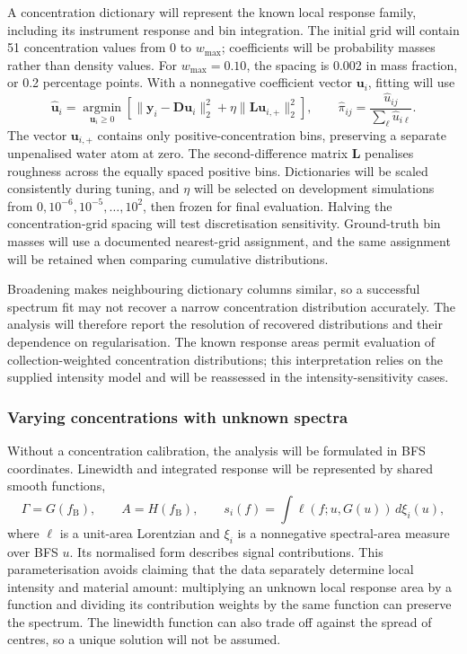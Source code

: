 \documentclass[11pt]{article}
\newcommand{\wmax}{w_{\max}}
\begin{document}
A concentration dictionary will represent the known local response family, including its instrument response and bin integration. The initial grid will contain 51 concentration values from 0 to $\wmax$; coefficients will be probability masses rather than density values. For $\wmax=0.10$, the spacing is 0.002 in mass fraction, or 0.2 percentage points. With a nonnegative coefficient vector $\mathbf u_i$, fitting will use
\begin{equation}
 \widehat{\mathbf u}_i=\underset{\mathbf u_i\geq0}{\operatorname{argmin}}
 \left[\|\mathbf y_i-\mathbf D\mathbf u_i\|_2^2+
 \eta\|\mathbf L\mathbf u_{i,+}\|_2^2\right],\qquad
 \widehat\pi_{ij}=\frac{\widehat u_{ij}}{\sum_\ell\widehat u_{i\ell}}.
 \label{eq:regularised_distribution}
\end{equation}
The vector $\mathbf u_{i,+}$ contains only positive-concentration bins, preserving a separate unpenalised water atom at zero. The second-difference matrix $\mathbf L$ penalises roughness across the equally spaced positive bins. Dictionaries will be scaled consistently during tuning, and $\eta$ will be selected on development simulations from $0,10^{-6},10^{-5},\ldots,10^2$, then frozen for final evaluation. Halving the concentration-grid spacing will test discretisation sensitivity. Ground-truth bin masses will use a documented nearest-grid assignment, and the same assignment will be retained when comparing cumulative distributions.

Broadening makes neighbouring dictionary columns similar, so a successful spectrum fit may not recover a narrow concentration distribution accurately. The analysis will therefore report the resolution of recovered distributions and their dependence on regularisation. The known response areas permit evaluation of collection-weighted concentration distributions; this interpretation relies on the supplied intensity model and will be reassessed in the intensity-sensitivity cases.

\subsubsection{Varying concentrations with unknown spectra}

Without a concentration calibration, the analysis will be formulated in BFS coordinates. Linewidth and integrated response will be represented by shared smooth functions,
\begin{equation}
 \Gamma=G(f_{\mathrm B}),\qquad A=H(f_{\mathrm B}),\qquad
 s_i(f)=\int \ell(f;u,G(u))\,d\xi_i(u),
 \label{eq:unknown_family}
\end{equation}
where $\ell$ is a unit-area Lorentzian and $\xi_i$ is a nonnegative spectral-area measure over BFS $u$. Its normalised form describes signal contributions. This parameterisation avoids claiming that the data separately determine local intensity and material amount: multiplying an unknown local response area by a function and dividing its contribution weights by the same function can preserve the spectrum. The linewidth function can also trade off against the spread of centres, so a unique solution will not be assumed.
\end{document}
